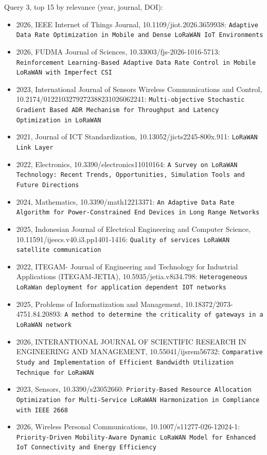 Query 3, top 15 by relevance (year, journal, DOI):

\begin{itemize}
\item 2026, IEEE Internet of Things Journal, 10.1109/jiot.2026.3659938: \texttt{Adaptive Data Rate Optimization in Mobile and Dense LoRaWAN IoT Environments}
\item 2026, FUDMA Journal of Sciences, 10.33003/fjs-2026-1016-5713: \texttt{Reinforcement Learning-Based Adaptive Data Rate Control in Mobile LoRaWAN with Imperfect CSI}
\item 2023, International Journal of Sensors Wireless Communications and Control, 10.2174/0122103279272388231026062241: \texttt{Multi-objective Stochastic Gradient Based ADR Mechanism for Throughput and Latency Optimization in LoRaWAN}
\item 2021, Journal of ICT Standardization, 10.13052/jicts2245-800x.911: \texttt{LoRaWAN Link Layer}
\item 2022, Electronics, 10.3390/electronics11010164: \texttt{A Survey on LoRaWAN Technology: Recent Trends, Opportunities, Simulation Tools and Future Directions}
\item 2024, Mathematics, 10.3390/math12213371: \texttt{An Adaptive Data Rate Algorithm for Power-Constrained End Devices in Long Range Networks}
\item 2025, Indonesian Journal of Electrical Engineering and Computer Science, 10.11591/ijeecs.v40.i3.pp1401-1416: \texttt{Quality of services LoRaWAN satellite communication}
\item 2022, ITEGAM- Journal of Engineering and Technology for Industrial Applications (ITEGAM-JETIA), 10.5935/jetia.v8i34.798: \texttt{Heterogeneous LoRaWan deployment for application dependent IOT networks}
\item 2025, Problems of Informatization and Management, 10.18372/2073-4751.84.20893: \texttt{A method to determine the criticality of gateways in a LoRaWAN network}
\item 2026, INTERANTIONAL JOURNAL OF SCIENTIFIC RESEARCH IN ENGINEERING AND MANAGEMENT, 10.55041/ijsrem56732: \texttt{Comparative Study and Implementation of Efficient Bandwidth Utilization Technique for LoRaWAN}
\item 2023, Sensors, 10.3390/s23052660: \texttt{Priority-Based Resource Allocation Optimization for Multi-Service LoRaWAN Harmonization in Compliance with IEEE 2668}
\item 2026, Wireless Personal Communications, 10.1007/s11277-026-12024-1: \texttt{Priority-Driven Mobility-Aware Dynamic LoRaWAN Model for Enhanced IoT Connectivity and Energy Efficiency}

\end{itemize}
